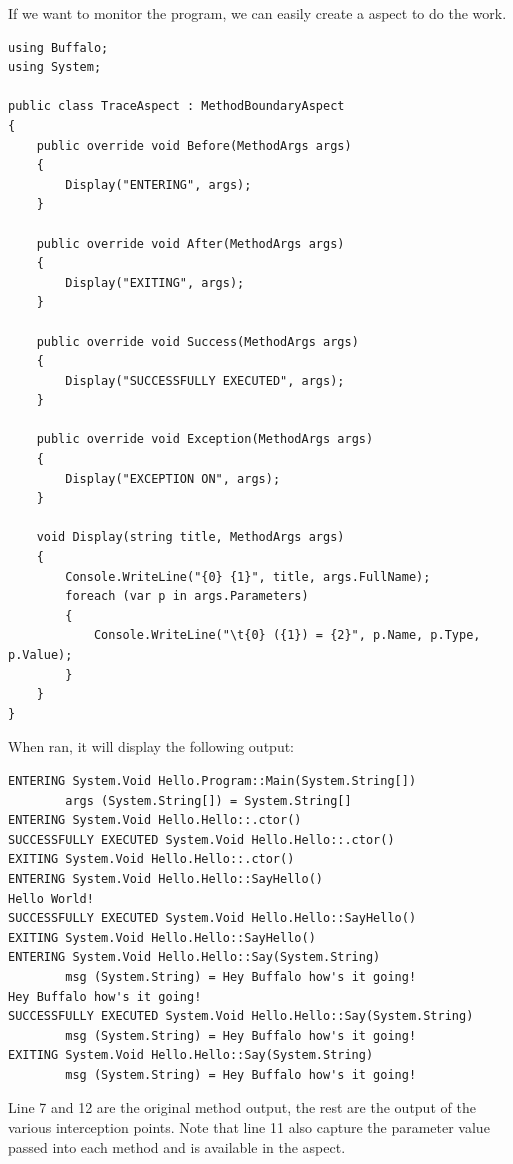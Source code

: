 If we want to monitor the program, we can easily create a aspect to do the work.

\begin{lstlisting}[caption={TraceAspect}, label=traceaspect, frame=tb, basicstyle=\scriptsize]
using Buffalo;
using System;

public class TraceAspect : MethodBoundaryAspect
{
    public override void Before(MethodArgs args)
    {
        Display("ENTERING", args);
    }

    public override void After(MethodArgs args)
    {
        Display("EXITING", args);
    }

    public override void Success(MethodArgs args)
    {
        Display("SUCCESSFULLY EXECUTED", args);
    }

    public override void Exception(MethodArgs args)
    {
        Display("EXCEPTION ON", args);
    }

    void Display(string title, MethodArgs args)
    {
        Console.WriteLine("{0} {1}", title, args.FullName);
        foreach (var p in args.Parameters)
        {
            Console.WriteLine("\t{0} ({1}) = {2}", p.Name, p.Type, p.Value);
        }
    }
}
\end{lstlisting}

When ran, it will display the following output:

\begin{lstlisting}[caption={TraceAspect output}, label=traceaspectout, frame=tb, basicstyle=\scriptsize]
ENTERING System.Void Hello.Program::Main(System.String[])
        args (System.String[]) = System.String[]
ENTERING System.Void Hello.Hello::.ctor()
SUCCESSFULLY EXECUTED System.Void Hello.Hello::.ctor()
EXITING System.Void Hello.Hello::.ctor()
ENTERING System.Void Hello.Hello::SayHello()
Hello World!
SUCCESSFULLY EXECUTED System.Void Hello.Hello::SayHello()
EXITING System.Void Hello.Hello::SayHello()
ENTERING System.Void Hello.Hello::Say(System.String)
        msg (System.String) = Hey Buffalo how's it going!
Hey Buffalo how's it going!
SUCCESSFULLY EXECUTED System.Void Hello.Hello::Say(System.String)
        msg (System.String) = Hey Buffalo how's it going!
EXITING System.Void Hello.Hello::Say(System.String)
        msg (System.String) = Hey Buffalo how's it going!
\end{lstlisting}

Line 7 and 12 are the original method output, the rest are the output of the various interception points. Note that line 11 also capture the parameter value passed into each method and is available in the aspect.

